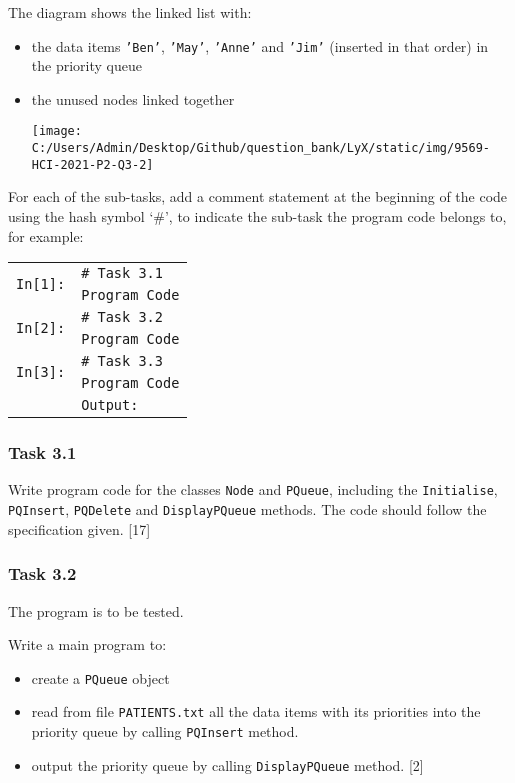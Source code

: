The diagram shows the linked list with: 
\begin{itemize}
\item the data items \texttt{'Ben'}, \texttt{'May'}, \texttt{'Anne'} and
\texttt{'Jim'} (inserted in that order) in the priority queue 
\item the unused nodes linked together 
\begin{center}
\texttt{[image: C:/Users/Admin/Desktop/Github/question\_bank/LyX/static/img/9569-HCI-2021-P2-Q3-2]}
\par\end{center}

\end{itemize}
For each of the sub-tasks, add a comment statement at the beginning
of the code using the hash symbol \textquoteleft \#\textquoteright ,
to indicate the sub-task the program code belongs to, for example: 
\noindent \begin{center}
\begin{tabular}{c|l|}
\cline{2-2} 
\multirow{2}{*}{\texttt{In{[}1{]}:}} & \texttt{\# Task 3.1}\tabularnewline
 & \texttt{Program Code}\tabularnewline
\cline{2-2} 
\multirow{2}{*}{\texttt{In{[}2{]}:}} & \texttt{\# Task 3.2}\tabularnewline
 & \texttt{Program Code}\tabularnewline
\cline{2-2} 
\multirow{2}{*}{\texttt{In{[}3{]}:}} & \texttt{\# Task 3.3}\tabularnewline
 & \texttt{Program Code}\tabularnewline
\cline{2-2} 
\multicolumn{1}{c}{} & \multicolumn{1}{l}{\texttt{Output:}}\tabularnewline
\end{tabular}
\par\end{center}

\subsubsection*{Task 3.1 }

Write program code for the classes \texttt{Node} and \texttt{PQueue},
including the \texttt{Initialise}, \texttt{PQInsert}, \texttt{PQDelete}
and \texttt{DisplayPQueue} methods. The code should follow the specification
given. \hfill{}{[}17{]}

\subsubsection*{Task 3.2 }

The program is to be tested. 

Write a main program to: 
\begin{itemize}
\item create a \texttt{PQueue} object 
\item read from file \texttt{PATIENTS.txt} all the data items with its priorities
into the priority queue by calling \texttt{PQInsert} method. 
\item output the priority queue by calling \texttt{DisplayPQueue} method.
\hfill{}{[}2{]}
\end{itemize}

